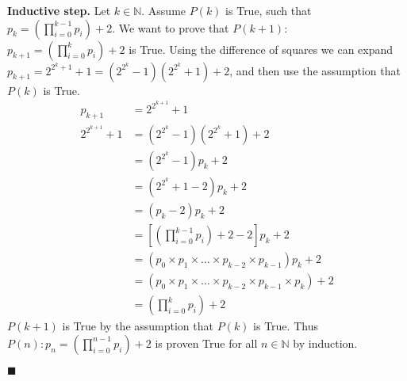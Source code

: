 \documentclass{article}
\newcommand\qedsymbol{\hfill$\blacksquare$}
\begin{document}
\begin{enumerate}[label=(\alph*)]
        \textbf{Inductive step.} Let $k\in \mathbb{N}$. Assume $P(k)$ is True, such 
        that $p_k = \left(\prod_{i=0}^{k-1}p_i \right) + 2$. 
        We want to prove that $P(k+1)$: $p_{k+1} = \left(\prod_{i=0}^{k} p_i \right)+2$ is True. 
        Using the difference of squares we can expand $p_{k+1} = 2^{2^k+1} + 1 = 
        (2^{2^k} - 1) (2^{2^k} + 1) + 2$, and then use the assumption that $P(k)$ 
        is True.
        \begin{align*} 
            p_{k+1} &= 2^{2^{k+1}} + 1\\    
            2^{2^{k+1}} + 1&= (2^{2^k} - 1) (2^{2^k} + 1) + 2 \tag*{(By difference of squares)}\\
                           &= (2^{2^{k}} - 1)p_k + 2 \tag*{(By definition of $p_k$)}\\ 
                           &= (2^{2^{k}} + 1 - 2)p_k + 2\\
                           &= (p_k - 2)p_k + 2 \tag*{(By definition of $p_k$)}\\ 
                           &= \left[ (\prod_{i=0}^{k-1} p_i) + 2 -2 \right] p_k + 2 \tag*{(By induction hypothesis)}\\ 
             &= (p_0 \times p_1 \times \ldots \times p_{k-2} 
             \times p_{k-1}) p_k + 2\\
             &= (p_0 \times p_1 \times \ldots \times p_{k-2} \times p_{k-1} 
             \times p_k) + 2 \\
             &= \left( \prod_{i=0}^{k} p_i \right) + 2  
        \end{align*}
        $P(k+1)$ is True by the assumption that $P(k)$ is True. Thus $P(n) : p_n =  
        \left(\prod_{i=0}^{n-1} p_i \right) + 2 $ is proven True for all $n \in \mathbb{N}$ 
        by induction.

        \qedsymbol 


\end{enumerate} 
\end{document}
